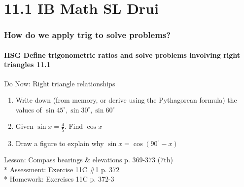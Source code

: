 \documentclass{beamer}
\begin{document}
  \section{11.1 IB Math SL Drui}
  \frame
  {
    \frametitle{How do we apply trig to solve problems?}
    \framesubtitle{HSG Define trigonometric ratios and solve problems involving right triangles \qquad \alert{11.1}}

  \begin{block}{Do Now: Right triangle relationships}
    \begin{enumerate}
      \item Write down (from memory, or derive using the Pythagorean formula) the values of $\sin{45^\circ}, \sin{30^\circ}, \sin{60^\circ}$
      \item Given $\sin{x}=\frac{4}{5}$. Find $\cos{x}$
      \item Draw a figure to explain why $\sin{x}=\cos{(90^\circ-x)}$
      \end{enumerate}
    \end{block}
    Lesson: Compass bearings \& elevations p. 369-373 (7th)\\*
    Assessment: Exercise 11C \#1 p. 372\\*
    Homework: Exercises 11C p. 372-3\\
  }
\end{document}
